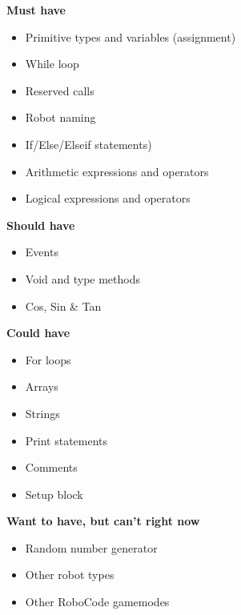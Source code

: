 \textbf{Must have}
\begin{itemize}
\item Primitive types and variables (assignment)
\item While loop
\item Reserved calls
\item Robot naming
\item If/Else/Elseif statements)
\item Arithmetic expressions and operators
\item Logical expressions and operators
\end{itemize}
\textbf{Should have}
\begin{itemize}
\item Events
\item Void and type methods
\item Cos, Sin \& Tan
\end{itemize}
\textbf{Could have}
\begin{itemize}
\item For loops
\item Arrays
\item Strings
\item Print statements
\item Comments
\item Setup block
\end{itemize}
\textbf{Want to have, but can’t right now}
\begin{itemize}
\item Random number generator
\item Other robot types
\item Other RoboCode gamemodes
\end{itemize}

 
